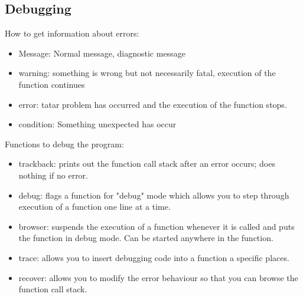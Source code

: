 \documentclass[a4paper,oneside, 12pt]{report}
\begin{document}
\subsection{Debugging}
How to get information about errors:
\begin{itemize}
	\item Message: Normal message, diagnostic message
	\item warning: something is wrong but not necessarily fatal, execution of the function continues
	\item error: tatar problem has occurred and the execution of the function stops.
	\item condition: Something unexpected has occur
\end{itemize}
Functions to debug the program:
\begin{itemize}
	\item trackback: prints out the function call stack after an error occurs; does nothing if no error.
	\item debug: flags a function for "debug" mode which allows you to step through execution of a function one line at a time.
	\item browser: suspends the execution of a function whenever it is called and puts the function in debug mode. Can be started anywhere in the function.
	\item trace: allows you to insert debugging code into a function a specific places.
	\item recover: allows you to modify the error behaviour so that you can browse the function call stack.
\end{itemize}
\end{document}
